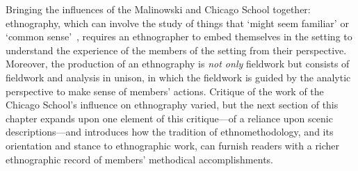 \begin{revisedsubmission}
Bringing the influences of the Malinowski and Chicago School together: ethnography, which can involve the study of things that `might seem familiar' or `common sense'~\citep[p. 160]{Crabtree2012}, requires an ethnographer to embed themselves in the setting to understand the experience of the members of the setting from their perspective.
Moreover, the production of an ethnography is \textit{not only} fieldwork but consists of fieldwork and analysis in unison, in which the fieldwork is guided by the analytic perspective to make sense of members' actions.
Critique of the work of the Chicago School's influence on ethnography varied, but the next section of this chapter expands upon one element of this critique---of a reliance upon scenic descriptions---and introduces how the tradition of ethnomethodology, and its orientation and stance to ethnographic work, can furnish readers with a richer ethnographic record of members' methodical accomplishments.
\end{revisedsubmission}







